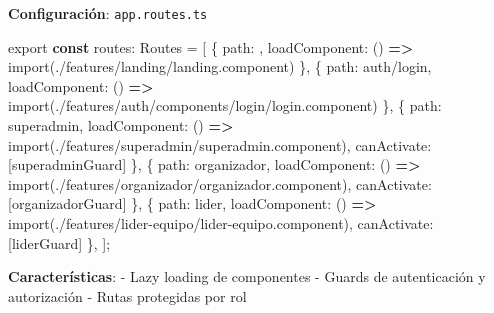 \documentclass[
  spanish,
  11pt,
  letterpaper,
]{book}
\newenvironment{Shaded}{\begin{snugshade}}{\end{snugshade}}
\newcommand{\ImportTok}[1]{\textcolor[rgb]{0.00,0.46,0.62}{#1}}
\newcommand{\KeywordTok}[1]{\textcolor[rgb]{0.00,0.23,0.31}{\textbf{#1}}}
\newcommand{\NormalTok}[1]{\textcolor[rgb]{0.00,0.23,0.31}{#1}}
\newcommand{\OperatorTok}[1]{\textcolor[rgb]{0.37,0.37,0.37}{#1}}
\newcommand{\StringTok}[1]{\textcolor[rgb]{0.13,0.47,0.30}{#1}}
\begin{document}
\textbf{Configuración}: \texttt{app.routes.ts}

\begin{Shaded}
\begin{Highlighting}[]
\ImportTok{export} \KeywordTok{const}\NormalTok{ routes}\OperatorTok{:}\NormalTok{ Routes }\OperatorTok{=}\NormalTok{ [}
\NormalTok{  \{ path}\OperatorTok{:} \StringTok{\textquotesingle{}\textquotesingle{}}\OperatorTok{,}\NormalTok{ loadComponent}\OperatorTok{:}\NormalTok{ () }\KeywordTok{=\textgreater{}} \ImportTok{import}\NormalTok{(}\StringTok{\textquotesingle{}./features/landing/landing.component\textquotesingle{}}\NormalTok{) \}}\OperatorTok{,}
\NormalTok{  \{ path}\OperatorTok{:} \StringTok{\textquotesingle{}auth/login\textquotesingle{}}\OperatorTok{,}\NormalTok{ loadComponent}\OperatorTok{:}\NormalTok{ () }\KeywordTok{=\textgreater{}} \ImportTok{import}\NormalTok{(}\StringTok{\textquotesingle{}./features/auth/components/login/login.component\textquotesingle{}}\NormalTok{) \}}\OperatorTok{,}
\NormalTok{  \{ path}\OperatorTok{:} \StringTok{\textquotesingle{}superadmin\textquotesingle{}}\OperatorTok{,}\NormalTok{ loadComponent}\OperatorTok{:}\NormalTok{ () }\KeywordTok{=\textgreater{}} \ImportTok{import}\NormalTok{(}\StringTok{\textquotesingle{}./features/superadmin/superadmin.component\textquotesingle{}}\NormalTok{)}\OperatorTok{,}\NormalTok{ canActivate}\OperatorTok{:}\NormalTok{ [superadminGuard] \}}\OperatorTok{,}
\NormalTok{  \{ path}\OperatorTok{:} \StringTok{\textquotesingle{}organizador\textquotesingle{}}\OperatorTok{,}\NormalTok{ loadComponent}\OperatorTok{:}\NormalTok{ () }\KeywordTok{=\textgreater{}} \ImportTok{import}\NormalTok{(}\StringTok{\textquotesingle{}./features/organizador/organizador.component\textquotesingle{}}\NormalTok{)}\OperatorTok{,}\NormalTok{ canActivate}\OperatorTok{:}\NormalTok{ [organizadorGuard] \}}\OperatorTok{,}
\NormalTok{  \{ path}\OperatorTok{:} \StringTok{\textquotesingle{}lider\textquotesingle{}}\OperatorTok{,}\NormalTok{ loadComponent}\OperatorTok{:}\NormalTok{ () }\KeywordTok{=\textgreater{}} \ImportTok{import}\NormalTok{(}\StringTok{\textquotesingle{}./features/lider{-}equipo/lider{-}equipo.component\textquotesingle{}}\NormalTok{)}\OperatorTok{,}\NormalTok{ canActivate}\OperatorTok{:}\NormalTok{ [liderGuard] \}}\OperatorTok{,}
\NormalTok{]}\OperatorTok{;}
\end{Highlighting}
\end{Shaded}

\textbf{Características}: - Lazy loading de componentes - Guards de
autenticación y autorización - Rutas protegidas por rol
\end{document}
